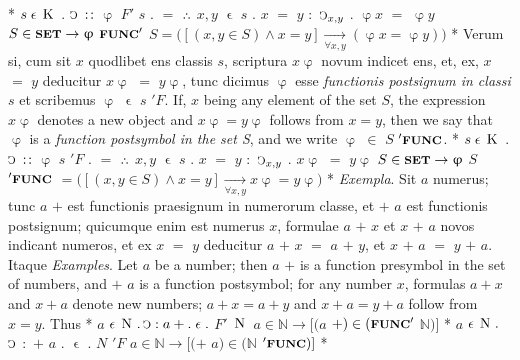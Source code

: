 \documentclass{book}
\newcommand{\C}{\mathop{\sbox0{$\displaystyle$$\reflectbox{C}$} %
\raisebox{-\height+\ht0-0.05cm}[\ht0][\dp0]{\scalebox{0.8}[0.8]{\copy0}}}\displaylimits} %
\newcommand{\pppNoSpace}{\leavevmode\lower0ex\hbox{.}\kern-0.1em\raise0.7ex\hbox{.}\kern-0.1em\lower0ex\hbox{.}} %
\newcommand{\smallIn}{\ensuremath{\mathrel{\epsilon}}}
\newcommand{\K}{\mathop{\thinspace \text{K} \thinspace}}
\newcommand{\N}{\mathop{\thinspace \text{N} \thinspace}}
\newcommand{\setOfSets}{\mathord{\text{{\footnotesize \textbf{SET}}}}}
\newcommand{\func}{\mathord{\text{{\footnotesize \textbf{FUNC}}}}}
\newenvironment{translateTwoCol}
               { %
                 \columnratio{0.5, 0.5} \begin{paracol}{2}
                 \newcommand{\LAT}{\switchcolumn[0]*}
                 \newcommand{\ENG}{\switchcolumn[1]}
               }
               { %
                 \let\ENG\undefined
                 \let\LAT\undefined
                 \end{paracol}
               }
\begin{document}
\begin{translateTwoCol}
\LAT
\hspace{1.06cm} $s \smallIn \K$ $.$ $\C$ $:\hspace{0.1em}:$ $\upvarphi$ $F'$ $s$ $.$ $=$ $\pppNoSpace$ $x,y$ $\smallIn$ $s$ $.$ $x$ $=$ $y$ $:$ $\C_{x,y}$ $.$ $\upvarphi x$ $=$ $\upvarphi y$
\ENG
\hspace{1.06cm} $S \in \setOfSets \rightarrow \upvarphi$ $\func'$ $S = \big( [(x,y \in S) \wedge x = y] \xrightarrow[\forall x,y]{} ( \upvarphi x = \upvarphi y) \big)$
\LAT
Verum si, cum sit $x$ quodlibet ens classis $s$, scriptura $x\upvarphi$ novum indicet ens, et, ex, $x$ $=$ $y$ deducitur $x\upvarphi$ $=$ $y\upvarphi$, tunc dicimus $\upvarphi$ esse \emph{functionis postsignum in classi} $s$ et scribemus $\upvarphi$ $\smallIn$ $s$ $'F$.
\ENG
If, $x$ being any element of the set $S$, the expression $x\upvarphi$ denotes a new object and $x\upvarphi = y\upvarphi$ follows from $x=y$, then we say that $\upvarphi$ is a \emph{function postsymbol in the set S}, and we write $\upvarphi$ $\in$ $S$ $'\func$.
\LAT
\hspace{1.06cm} $s \smallIn \K$ $.$ $\C$ $:\hspace{0.1em}:$ $\upvarphi$ $s$ $'F$ $.$ $=$ $\pppNoSpace$ $x,y$ $\smallIn$ $s$ $.$ $x$ $=$ $y$ $:$ $\C_{x,y}$ $.$ $x\upvarphi$ $=$ $y\upvarphi$
\ENG
\hspace{1.06cm} $S \in \setOfSets \rightarrow \upvarphi$ $S$ $'\func$ $= \big( [(x,y \in S) \wedge x=y] \xrightarrow[\forall x,y]{} x\upvarphi=y\upvarphi \big)$
\LAT
\emph{Exempla}. Sit $a$ numerus; tunc $a$ $+$ est functionis praesignum in numerorum classe, et $+$ $a$ est functionis postsignum; quicumque enim est numerus $x$, formulae $a$ $+$ $x$ et $x$ $+$ $a$ novos indicant numeros, et ex $x$ $=$ $y$ deducitur $a$ $+$ $x$ $=$ $a$ $+$ $y$, et $x$ $+$ $a$ $=$ $y$ $+$ $a$. Itaque
\ENG
\emph{Examples}. Let $a$ be a number; then $a$ $+$ is a function presymbol in the set of numbers, and $+$ $a$ is a function postsymbol; for any number $x$, formulas $a+x$ and $x+a$ denote new numbers; $a+x=a+y$ and $x+a=y+a$ follow from $x=y$. Thus 
\LAT
\hspace{1.06cm} $a$ $\smallIn \N . \C : a + . \smallIn .$ $F'$ $\N$
\ENG
\hspace{1.06cm} $a \in \mathbb{N} \rightarrow [(a$ $+) \in (\func'$ $\mathbb{N})]$
\LAT
\hspace{1.06cm} $a$ $\smallIn \N .$ $\C$ $:$ $+$ $a$ $.$ $\smallIn$ $.$ $N$ $'F$
\ENG
\hspace{1.06cm} $a \in \mathbb{N} \rightarrow [(+$ $a) \in (\mathbb{N}$ $'\func)]$
\LAT
\hfill
\ENG

\end{translateTwoCol}
\end{document}

